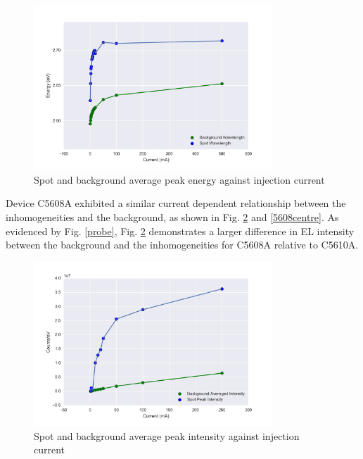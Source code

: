 \begin{figure}[!ht]
	\centering
	\includegraphics[width=0.8\textwidth]{Figs/Ch3/CentercompeV.png}
	\caption[h] {Spot and background average peak energy against injection current}
	\label{5610centrecomp}
\end{figure}

\FloatBarrier 

Device C5608A exhibited a similar current dependent relationship between the inhomogeneities and the background, as shown in Fig. \ref{5608peak} and \ref{5608centre}. As evidenced by Fig. \ref{probe}, Fig. \ref{5608peak} demonstrates a larger difference in EL intensity between the background and the inhomogeneities for C5608A relative to C5610A.

\begin{figure}[!ht]
	\centering
	\includegraphics[width=0.8\textwidth]{Figs/Ch3/Peakcomp5608.png}
	\caption[h] {Spot and background average peak intensity against injection current}
	\label{5608peak}
\end{figure}
\FloatBarrier 

